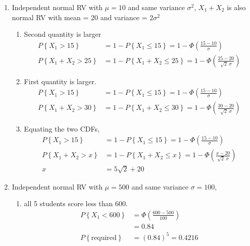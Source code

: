 \begin{enumerate}
	\item Independent normal RV with $ \mu = 10 $ and same variance $ \sigma^2 $,
	$ X_1 + X_2 $ is also normal RV with mean = 20 and variance = $ 2 \sigma^2 $
	
		\begin{enumerate}
			\item Second quantity is larger
			\begin{align}
				P \left\{X_1 > 15\right\} &= 1 - P \left\{X_1 \leq 15\right\} = 1 - \Phi\left(\frac{15 - 10}{\sigma}\right) \nonumber \\
				P \left\{X_1 + X_2 > 25\right\} &= 1 - P \left\{X_1 + X_2 \leq 25\right\} = 1 - \Phi\left(\frac{25  -  20}{\sqrt{2}\ \sigma}\right) 
			\end{align}
			
			
			\item First quantity is larger.
			\begin{align}
				P \left\{X_1 > 15\right\} &= 1 - P \left\{X_1 \leq 15\right\} = 1 - \Phi\left(\frac{15 - 10}{\sigma}\right) \nonumber \\
				P \left\{X_1 + X_2 > 30\right\} &= 1 - P \left\{X_1 + X_2 \leq 30\right\} = 1 - \Phi\left(\frac{30  -  20}{\sqrt{2}\ \sigma}\right) 
			\end{align}
			
			
			\item Equating the two CDFs,
			\begin{align}
				P \left\{X_1 > 15\right\} &= 1 - P \left\{X_1 \leq 15\right\} = 1 - \Phi\left(\frac{15 - 10}{\sigma}\right) \nonumber \\
				P \left\{X_1 + X_2 > x\right\} &= 1 - P \left\{X_1 + X_2 \leq x\right\} = 1 - \Phi\left(\frac{x  -  20}{\sqrt{2}\ \sigma}\right) \nonumber \\
				x &= 5\sqrt{2} + 20
			\end{align}	
		\end{enumerate}
	
	
	\item Independent normal RV with $ \mu = 500 $ and same variance $ \sigma = 100 $,
	
		\begin{enumerate}
			\item all 5 students score less than 600.
			\begin{align}
				P \left\{X_1 < 600\right\} &= \Phi\left(\frac{600 - 500}{100}\right) \nonumber \\
				&= 0.84 \nonumber \\
				P\left\{\text{required}\right\} &= (0.84)^5 = 0.4216
			\end{align}
			

\end{enumerate}
\end{enumerate}
